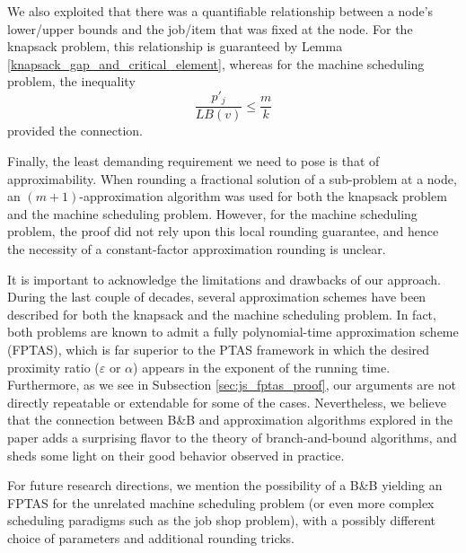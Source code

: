 \documentclass[moor,sglanonrev]{informs4}
\theoremstyle{plain}
\begin{document}
We also exploited that there was a quantifiable relationship between a node's lower/upper bounds and the job/item that was fixed at the node. For the knapsack problem, this relationship is guaranteed by Lemma \ref{knapsack_gap_and_critical_element}, whereas for the machine scheduling problem, the inequality
\[
\frac{p'_j}{LB(v)} \le \frac{m}{k}
\]
provided the connection.

Finally, the least demanding requirement we need to pose is that of approximability. When rounding a fractional solution of a sub-problem at a node, an $(m+1)$-approximation algorithm was used for both the knapsack problem and the machine scheduling problem. However, for the machine scheduling problem, the proof did not rely upon this local rounding guarantee, and hence the necessity of a constant-factor approximation rounding is unclear.

\bigskip

It is important to acknowledge the limitations and drawbacks of our approach. During the last couple of decades, several approximation schemes have been described for both the knapsack and the machine scheduling problem. In fact, both problems are known to admit a fully polynomial-time approximation scheme (FPTAS), which is far superior to the PTAS framework in which the desired proximity ratio ($\varepsilon$ or $\alpha$) appears in the exponent of the running time. Furthermore, as we see in Subsection \ref{sec:js_fptas_proof}, our arguments are not directly repeatable or extendable for some of the cases. Nevertheless, we believe that the connection between B\&B and approximation algorithms explored in the paper adds a surprising flavor to the theory of branch-and-bound algorithms, and sheds some light on their good behavior observed in practice.

For future research directions, we mention the possibility of a B\&B yielding an FPTAS for the unrelated machine scheduling problem (or even more complex scheduling paradigms such as the job shop problem), with a possibly different choice of parameters and additional rounding tricks.




\end{document}
